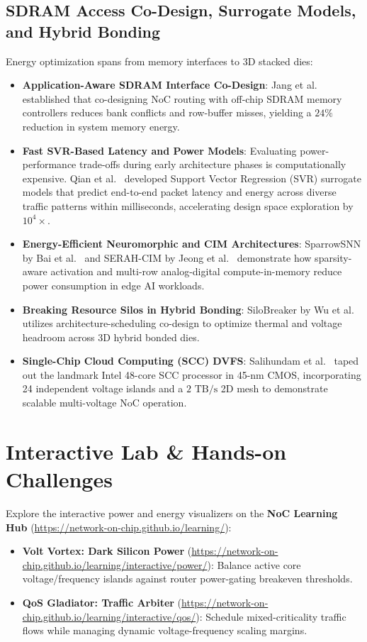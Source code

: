 \subsection{SDRAM Access Co-Design, Surrogate Models, and Hybrid Bonding}
\label{sec:ch6_sdram_surrogate}
Energy optimization spans from memory interfaces to 3D stacked dies:
\begin{itemize}
    \item \textbf{Application-Aware SDRAM Interface Co-Design}: Jang et al.~\cite{Jang2011SDRAM} established that co-designing NoC routing with off-chip SDRAM memory controllers reduces bank conflicts and row-buffer misses, yielding a $24\%$ reduction in system memory energy.
    \item \textbf{Fast SVR-Based Latency and Power Models}: Evaluating power-performance trade-offs during early architecture phases is computationally expensive. Qian et al.~\cite{Qian2016SVR} developed Support Vector Regression (SVR) surrogate models that predict end-to-end packet latency and energy across diverse traffic patterns within milliseconds, accelerating design space exploration by $10^4\times$.
    \item \textbf{Energy-Efficient Neuromorphic and CIM Architectures}: SparrowSNN by Bai et al.~\cite{Bai2026Sparrow} and SERAH-CIM by Jeong et al.~\cite{Jeong2026SERAH} demonstrate how sparsity-aware activation and multi-row analog-digital compute-in-memory reduce power consumption in edge AI workloads.
    \item \textbf{Breaking Resource Silos in Hybrid Bonding}: SiloBreaker by Wu et al.~\cite{Wu2026Silo} utilizes architecture-scheduling co-design to optimize thermal and voltage headroom across 3D hybrid bonded dies.
    \item \textbf{Single-Chip Cloud Computing (SCC) DVFS}: Salihundam et al.~\cite{Salihundam2011SCC} taped out the landmark Intel 48-core SCC processor in 45-nm CMOS, incorporating 24 independent voltage islands and a $2\text{ TB/s}$ 2D mesh to demonstrate scalable multi-voltage NoC operation.
\end{itemize}

\section{Interactive Lab \& Hands-on Challenges}
\label{sec:ch6_interactive}

Explore the interactive power and energy visualizers on the \textbf{NoC Learning Hub} (\url{https://network-on-chip.github.io/learning/}):
\begin{itemize}
    \item \textbf{Volt Vortex: Dark Silicon Power} (\url{https://network-on-chip.github.io/learning/interactive/power/}): Balance active core voltage/frequency islands against router power-gating breakeven thresholds.
    \item \textbf{QoS Gladiator: Traffic Arbiter} (\url{https://network-on-chip.github.io/learning/interactive/qos/}): Schedule mixed-criticality traffic flows while managing dynamic voltage-frequency scaling margins.
\end{itemize}

